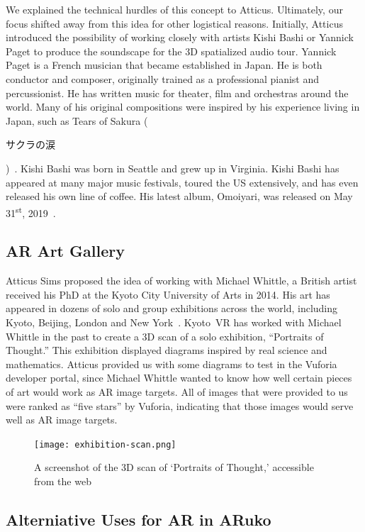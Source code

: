 \documentclass[a4paper, 10pt, american, titlepage]{article}
\begin{document}
We explained the technical hurdles of this concept to Atticus. Ultimately, our
focus shifted away from this idea for other logistical reasons. Initially,
Atticus introduced the possibility of working closely with artists Kishi Bashi
or Yannick Paget to produce the soundscape for the 3D spatialized audio tour.
Yannick Paget is a French musician that became established in Japan. He is both
conductor and composer, originally trained as a professional pianist and
percussionist. He has written music for theater, film and orchestras around the
world. Many of his original compositions were inspired by his experience living
in Japan, such as Tears of Sakura
(\begin{CJK}{UTF8}{min}サクラの涙\end{CJK})~\autocite{yannickpaget2016}. Kishi
Bashi was born in Seattle and grew up in Virginia. Kishi Bashi has appeared at
many major music festivals, toured the US extensively, and has even released his
own line of coffee. His latest album, Omoiyari, was released on May
31\textsuperscript{st}, 2019~\autocite{kishibashi2019}.

\subsection{AR Art Gallery}
\label{sec:arArtGallery}

Atticus Sims proposed the idea of working with Michael Whittle, a British artist
received his PhD at the Kyoto City University of Arts in 2014. His art has
appeared in dozens of solo and group exhibitions across the world,
including Kyoto, Beijing, London and New York~\autocite{michaelwhittle2019}.
Kyoto~VR has worked with Michael Whittle in the past to create a 3D scan of a
solo exhibition, ``Portraits of Thought.'' This exhibition displayed diagrams
inspired by real science and mathematics. Atticus provided us with some
diagrams to test in the Vuforia developer portal, since Michael Whittle wanted
to know how well certain pieces of art would work as AR image targets. All of
images that were provided to us were ranked as ``five stars'' by Vuforia,
indicating that those images would serve well as AR image targets.

\begin{figure}[h]
	\centering
	\texttt{[image: exhibition-scan.png]}
    \caption{A screenshot of the 3D scan of `Portraits of Thought,' accessible
    from the web}
	\label{fig:exhibitionScan}
\end{figure}

\subsection{Alterniative Uses for AR in ARuko}
\label{sec:alternativeARukoAR}
\end{document}

